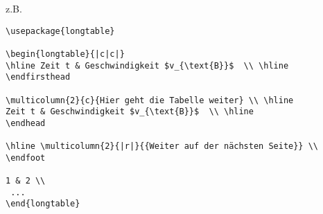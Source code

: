 \begin{loesung}
z.B. 
\begin{verbatim}
\usepackage{longtable}
 
\begin{longtable}{|c|c|}
\hline Zeit t & Geschwindigkeit $v_{\text{B}}$  \\ \hline 
\endfirsthead

\multicolumn{2}{c}{Hier geht die Tabelle weiter} \\ \hline 
Zeit t & Geschwindigkeit $v_{\text{B}}$  \\ \hline 
\endhead

\hline \multicolumn{2}{|r|}{{Weiter auf der nächsten Seite}} \\ 
\endfoot

1 & 2 \\ 
 ...
\end{longtable}
\end{verbatim}
\end{loesung}

